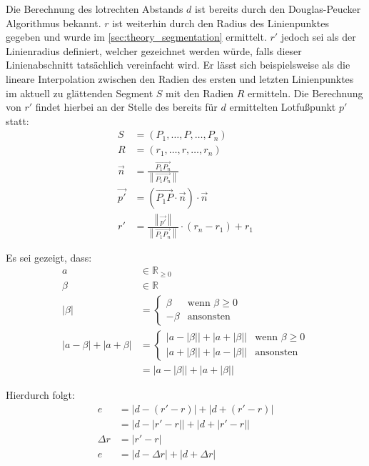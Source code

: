 Die Berechnung des lotrechten Abstands \(d\) ist bereits durch den Douglas-Peucker Algorithmus bekannt.
\(r\) ist weiterhin durch den Radius des Linienpunktes gegeben und wurde im \autoref{sec:theory_segmentation} ermittelt.
\(r'\) jedoch sei als der Linienradius definiert, welcher gezeichnet werden würde, falls dieser Linienabschnitt tatsächlich vereinfacht wird.
Er lässt sich beispielsweise als die lineare Interpolation zwischen den Radien des ersten und letzten Linienpunktes im aktuell zu glättenden Segment \(S\) mit den Radien \(R\) ermitteln.
Die Berechnung von \(r'\) findet hierbei an der Stelle des bereits für \(d\) ermittelten Lotfußpunkt \(p'\) statt:
\begin{align}
    S &= (P_1, \ldots, P, \ldots, P_n) \\
    R &= (r_1, \ldots, r, \ldots, r_n) \\[3mm]
    \overrightarrow{n} &= \frac{\overrightarrow{P_1 P_n}}{\left\|\overrightarrow{P_1 P_n}\right\|} \\
    \overrightarrow{p'} &= \left(\overrightarrow{P_1 P} \cdot \overrightarrow{n} \right) \cdot \overrightarrow{n} \\
    r' &= \frac{\left\|\overrightarrow{p'}\right\|}{\left\|\overrightarrow{P_1 P_n}\right\|} \cdot (r_n - r_1) + r_1
\end{align}

Es sei gezeigt, dass:
\begin{align}
    a &\in ℝ_{≥0} \\
    β &\in ℝ \\[3mm]
    |β| &= \begin{cases}
         β & \text{wenn } β ≥ 0 \\
        -β & \text{ansonsten}
    \end{cases} \\
    |a - β| + |a + β| &= \begin{cases}
        \big|a - |β|\big| + \big|a + |β|\big| & \text{wenn } β ≥ 0 \\
        \big|a + |β|\big| + \big|a - |β|\big| & \text{ansonsten}
    \end{cases} \\
                      &= \big|a - |β|\big| + \big|a + |β|\big|
\end{align}

Hierdurch folgt:
\begin{align}
    e &= |d - (r' - r)| + |d + (r' - r)| \\
      &= \big|d - |r' - r|\big| + \big|d + |r' - r|\big| \\[3mm]
    Δr &= |r' - r| \\
    \label{eq:theory_postprocess_abs}
    e &= \big|d - Δr\big| + \big|d + Δr\big|
\end{align}

